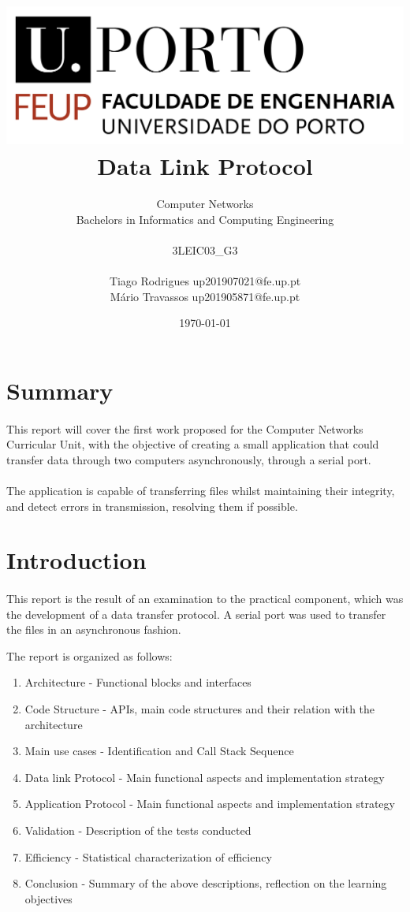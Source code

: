 \documentclass[11pt]{article}
\title{\includegraphics[scale=0.3]{logo.png} \\ \textbf{Data Link Protocol}}
\author{Computer Networks\\ Bachelors in Informatics and Computing Engineering \\ \\ 3LEIC03\_G3 \\ \\ Tiago
Rodrigues up201907021@fe.up.pt \\ Mário Travassos up201905871@fe.up.pt  }
\date{\today}
\begin{document}
\maketitle

\newpage

\section*{Summary}

\paragraph{}This report will cover the first work proposed for the Computer Networks Curricular Unit, with
the objective of creating a small application that could transfer data through two computers asynchronously,
through a serial port.

\paragraph{}The application is capable of transferring files whilst maintaining their integrity, and detect errors in transmission, resolving them if possible.

\section*{Introduction}

\paragraph{}This report is the result of an examination to the practical component, which was the
development of a data transfer protocol. A serial port was used to transfer the files in an asynchronous
fashion.

The report is organized as follows:

\begin{enumerate}
  \item{Architecture - Functional blocks and interfaces}
  \item{Code Structure - APIs, main code structures and their relation with the architecture}
  \item{Main use cases - Identification and Call Stack Sequence}
  \item{Data link Protocol - Main functional aspects and implementation strategy}
  \item{Application Protocol - Main functional aspects and implementation strategy }
  \item{Validation - Description of the tests conducted}
  \item{Efficiency - Statistical characterization of efficiency}
  \item{Conclusion - Summary of the above descriptions, reflection on the learning objectives}
\end{enumerate}
\end{document}
